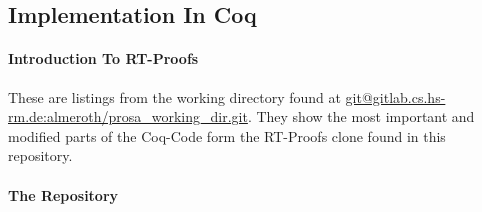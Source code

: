 
\subsection{Implementation In Coq}


\paragraph{Introduction To RT-Proofs}

These are listings from the working directory found at \url{git@gitlab.cs.hs-rm.de:almeroth/prosa_working_dir.git}.
They show the most important and modified parts of the Coq-Code form the RT-Proofs clone found in this repository.




\paragraph{The Repository}

